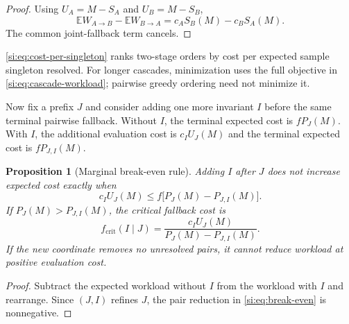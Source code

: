 \documentclass[9pt,twoside]{pnas-new}
\newtheorem{proposition}[theorem]{Proposition}
\theoremstyle{definition}
\theoremstyle{remark}
\begin{document}
\begin{proof}
Using $U_A=M-S_A$ and $U_B=M-S_B$,
\[
 \mathbb EW_{A\to B}-\mathbb EW_{B\to A}
 =c_AS_B(M)-c_BS_A(M).
\]
The common joint-fallback term cancels.
\end{proof}

\eqref{si:eq:cost-per-singleton} ranks two-stage orders by cost per expected sample singleton resolved.  For longer cascades, minimization uses the full objective in \eqref{si:eq:cascade-workload}; pairwise greedy ordering need not minimize it.

Now fix a prefix $J$ and consider adding one more invariant $I$ before the same terminal pairwise fallback.  Without $I$, the terminal expected cost is $fP_J(M)$.  With $I$, the additional evaluation cost is $c_IU_J(M)$ and the terminal expected cost is $fP_{J,I}(M)$.

\begin{proposition}[Marginal break-even rule]
\label{si:prop:break-even}
Adding $I$ after $J$ does not increase expected cost exactly when
\begin{equation}
 c_IU_J(M)
 \le
 f\bigl[P_J(M)-P_{J,I}(M)\bigr].
 \label{si:eq:break-even}
\end{equation}
If $P_J(M)>P_{J,I}(M)$, the critical fallback cost is
\begin{equation}
 f_{\mathrm{crit}}(I\mid J)
 =\frac{c_IU_J(M)}{P_J(M)-P_{J,I}(M)}.
 \label{si:eq:critical-fallback}
\end{equation}
If the new coordinate removes no unresolved pairs, it cannot reduce workload at positive evaluation cost.
\end{proposition}

\begin{proof}
Subtract the expected workload without $I$ from the workload with $I$ and rearrange.  Since $(J,I)$ refines $J$, the pair reduction in \eqref{si:eq:break-even} is nonnegative.
\end{proof}
\end{document}
